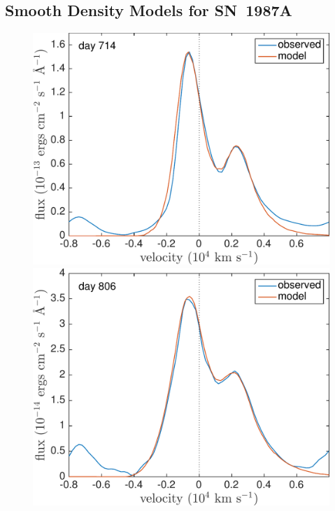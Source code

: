 \subsection{Smooth Density Models for SN~1987A}
\label{smooth_models}

\begin{figure}
\centering

\includegraphics[trim =0 25 0 0,clip=true,scale=0.4]{chapters/chapter5/images/smooth/best_fit/d714OI.pdf}
\hspace{1mm}
\includegraphics[trim =25 25 0 0,clip=true,scale=0.4]{chapters/chapter5/images/smooth/best_fit/d806OI_ext.pdf}


\end{figure}
